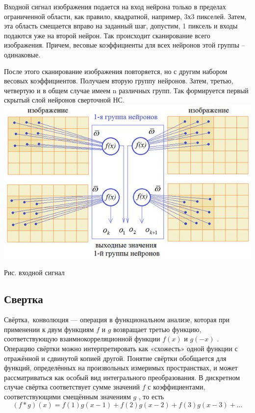 \documentclass{article}
\begin{document}
	Входной сигнал изображения подается на вход нейрона только в пределах ограниченной области, как правило, квадратной, например, 3х3 пикселей. Затем, эта область смещается вправо на заданный шаг, допустим, 1 пиксель и входы подаются уже на второй нейрон. Так происходит сканирование всего изображения. Причем, весовые коэффициенты для всех нейронов этой группы – одинаковые.

	После этого сканирование изображения повторяется, но с другим набором весовых коэффициентов. Получаем вторую группу нейронов. Затем, третью, четвертую и в общем случае имеем n различных групп. Так формируется первый скрытый слой нейронов сверточной НС.\\
	
	\noindent \includegraphics[width=\textwidth]{pic1.jpg}
	\begin{center}
		Рис. входной сигнал
	\end{center}

	\subsection{Свертка}
	
	Свёртка, конволюция — операция в функциональном анализе, которая при применении к двум функциям 
	$\displaystyle f$
	и 
	$\displaystyle g$
	возвращает третью функцию, соответствующую взаимнокорреляционной функции 
	$\displaystyle f(x)$
	и 
	$\displaystyle g(-x)$
	. Операцию свёртки можно интерпретировать как «схожесть» одной функции с отражённой и сдвинутой копией другой. Понятие свёртки обобщается для функций, определённых на произвольных измеримых пространствах, и может рассматриваться как особый вид интегрального преобразования. В дискретном случае свёртка соответствует сумме значений 
	$\displaystyle f$
	с коэффициентами, соответствующими смещённым значениям 
	$\displaystyle g$
	, то есть 
	$$\displaystyle (f*g)(x)=f(1)g(x-1)+f(2)g(x-2)+f(3)g(x-3)+\dots$$
	
\end{document}
